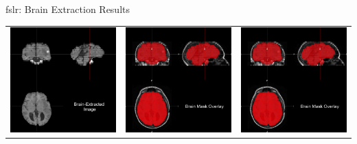 \documentclass[11pt]{beamer}\usepackage[]{graphicx}\usepackage[]{color}
\begin{document}
\begin{frame}[fragile]{fslr: Brain Extraction Results}

\begin{tabular}{ccc}
\includegraphics[width=0.32\linewidth]{BET_Image.png} & \includegraphics[width=0.32\linewidth]{BET_Image_Overlay.png} & \includegraphics[width=0.32\linewidth]{BET_Image_Overlay.png} 
\end{tabular}

\end{frame}
\end{document}
